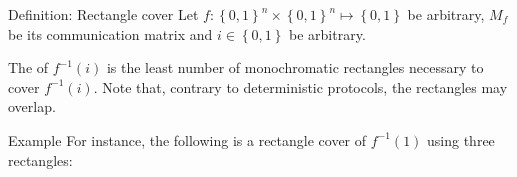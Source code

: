 \documentclass[a4paper]{article}
\begin{document}
\begin{parag}{Definition: Rectangle cover}
    Let $f: \left\{0, 1\right\}^n \times \left\{0, 1\right\}^n \mapsto \left\{0, 1\right\}$ be arbitrary, $M_f$ be its communication matrix and $i \in \left\{0, 1\right\}$ be arbitrary.

    The  of $f^{-1}\left(i\right)$ is the least number of monochromatic rectangles necessary to cover $f^{-1}\left(i\right)$. Note that, contrary to deterministic protocols, the rectangles may overlap.

    \begin{subparag}{Example}
        For instance, the following is a rectangle cover of $f^{-1}\left(1\right)$ using three rectangles:
    \end{subparag}
\end{parag}
\end{document}
